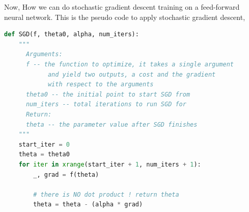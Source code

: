 Now, How we can do stochastic gradient descent training on a feed-forward neural network. This is the pseudo code to apply stochastic gradient descent,


\begin{lstlisting}[language=Python]
def SGD(f, theta0, alpha, num_iters):
    """
      Arguments:
      f -- the function to optimize, it takes a single argument
            and yield two outputs, a cost and the gradient
            with respect to the arguments
      theta0 -- the initial point to start SGD from
      num_iters -- total iterations to run SGD for
      Return:
      theta -- the parameter value after SGD finishes
    """
    start_iter = 0
    theta = theta0
    for iter in xrange(start_iter + 1, num_iters + 1):
        _, grad = f(theta)
  
        # there is NO dot product ! return theta
        theta = theta - (alpha * grad)
\end{lstlisting}



